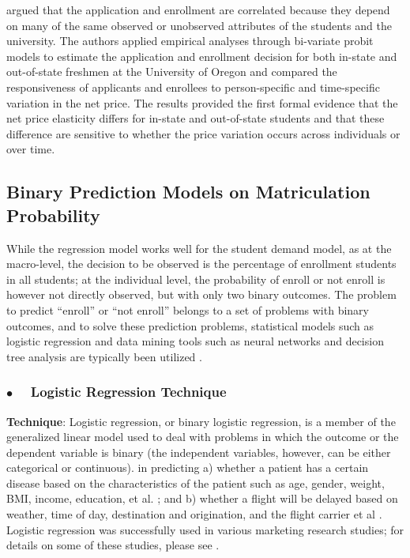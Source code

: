 \documentclass[12pt,english]{report}
\begin{document}
\citet{Curs2002} argued that the application and enrollment are correlated
because they depend on many of the same observed or unobserved attributes of
the students and the university.  The authors applied empirical analyses
through bi-variate probit models  to estimate  the application and enrollment
decision for both in-state and out-of-state freshmen at the University of
Oregon and compared the responsiveness of applicants and enrollees to
person-specific and time-specific variation in the net price.   The results
provided the first formal evidence that the net price elasticity differs for
in-state and out-of-state students and that these difference are sensitive to
whether the price variation occurs across individuals or over time.

\subsection{Binary Prediction Models on Matriculation Probability}
While the regression model works well for the student demand model, as at the
macro-level, the decision to be observed is the percentage of enrollment
students in all students;  at the individual level,  the probability of enroll
or not enroll is however not directly observed, but with only two binary
outcomes.  The problem to predict ``enroll'' or ``not enroll'' belongs to a set
of problems with binary outcomes, and to solve these prediction problems,
statistical models such as logistic regression and data mining tools such as
neural networks and decision tree analysis are typically been utilized
\citep{Han2011, James2014}.

\subsubsection{$\bullet \quad$  Logistic Regression Technique}
\textbf{Technique}: Logistic regression, or binary logistic regression, is a
member of the generalized linear model used to deal with problems in which the
outcome or the dependent variable is binary (the independent variables,
however,  can be either categorical or continuous). %
in predicting a) whether a patient has a certain disease based on the
characteristics of the patient such as age, gender, weight, BMI, income,
education, et al.  \citep{Allenby1994}; and b) whether a flight will be delayed
based on weather, time of day, destination and origination, and the flight
carrier et al \citep{Bhat1995}.
Logistic regression was successfully used in various marketing research
studies; for details on some of these studies, please see \citep{Hosmer2013}.
\end{document}
